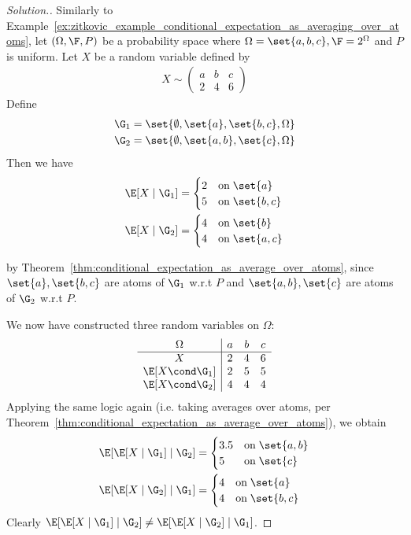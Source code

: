 \documentclass{article} %
\begin{document}
\begin{proof}[Solution.]
Similarly to Example~\ref{ex:zitkovic_example_conditional_expectation_as_averaging_over_atoms}, let $(\Omega, \F, P)$ be a probability space where $\Omega =\set{a,b,c}, \F=2^\Omega$ and $P$ is uniform.  Let $X$ be a random variable defined by 
\begin{align*}
X \sim 
\begin{pmatrix}
a & b & c \\
2 & 4 & 6 	
\end{pmatrix}
\end{align*}
Define
\begin{align*}
\G_1 &= \set{\emptyset, \set{a}, \set{b,c}, \Omega} \\
\G_2 &= \set{\emptyset, \set{a,b}, \set{c}, \Omega} \\
\end{align*}
Then we have 
\begin{align*}
\E[X \mid \G_1] &= 
\begin{cases}
2 & \text{on} \; \set{a} \\
5 & \text{on} \; \set{b,c} \\	
\end{cases}
\\
\E[X \mid \G_2] &=
\begin{cases}
4 & \text{on} \; \set{b} \\
4 & \text{on} \; \set{a,c} \\	
\end{cases}
\end{align*}

by Theorem~\ref{thm:conditional_expectation_as_average_over_atoms}, since $\set{a}, \set{b,c}$ are atoms of $\G_1$ w.r.t $P$ and $\set{a,b}, \set{c}$ are atoms of $\G_2$ w.r.t $P$.

We now have constructed three random variables on $\Omega$:
\[\begin{array}{c|ccc}
\Omega & a & b & c \\
\hline 
X & 2 & 4 & 6 \\
\E[X \cond \G_1] & 2 & 5 & 5 \\
\E[X \cond \G_2] & 4 & 4 & 4  
\end{array}\]
Applying the same logic again (i.e. taking averages over atoms, per Theorem~\ref{thm:conditional_expectation_as_average_over_atoms}), we obtain 
%
\begin{align*}
\E[\E[X \mid \G_1] \mid \G_2] &= 
\begin{cases}
3.5 & \text{on} \; \set{a,b} \\
5 & \text{on} \; \set{c} \\	
\end{cases}
\\
\E[\E[X \mid \G_2]\mid \G_1] &=
\begin{cases}
4 & \text{on} \; \set{a} \\
4 & \text{on} \; \set{b,c} \\	
\end{cases}
\end{align*}
%
Clearly $\E[\E[X \mid \G_1] \mid \G_2] \neq \E[\E[X \mid \G_2] \mid \G_1]$.
\end{proof}
\end{document}
